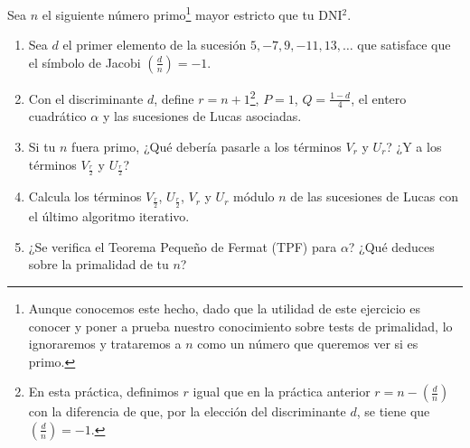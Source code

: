 	Sea $n$ el siguiente número primo\footnote{Aunque conocemos este hecho, dado que la utilidad de este ejercicio
	es conocer y poner a prueba nuestro conocimiento sobre tests de primalidad, lo ignoraremos y trataremos a $n$
	como un número que queremos ver si es primo.} mayor estricto que tu DNI$^2$.
	\begin{enumerate}
		\item Sea $d$ el primer elemento de la sucesión $5, -7, 9, -11, 13,\dots$ que satisface que el símbolo
		de Jacobi $\displaystyle \left(\frac{d}{n}\right) = -1$.
		\item Con el discriminante $d$, define $r = n+1$\footnote{En esta práctica, definimos $r$ igual que en
		la práctica anterior $r = n - \displaystyle \left(\frac{d}{n}\right)$ con la diferencia de que, por la
		elección del discriminante $d$, se tiene que $\displaystyle \left(\frac{d}{n}\right) = -1$.}, $P = 1$,
		$Q = \displaystyle \frac{1-d}{4}$, el entero cuadrático $\alpha$ y las sucesiones de Lucas asociadas.
		\item Si tu $n$ fuera primo, ¿Qué debería pasarle a los términos $V_r$ y $U_r$? ¿Y a los términos
		$V_{\frac{r}{2}}$ y $U_{\frac{r}{2}}$?
		\item Calcula los términos $V_{\frac{r}{2}}$, $U_{\frac{r}{2}}$, $V_r$ y $U_r$ módulo $n$ de las sucesiones
		de Lucas con el último algoritmo iterativo.
		\item ¿Se verifica el Teorema Pequeño de Fermat (TPF) para $\alpha$? ¿Qué deduces sobre la primalidad
		de tu $n$?
	\end{enumerate}

